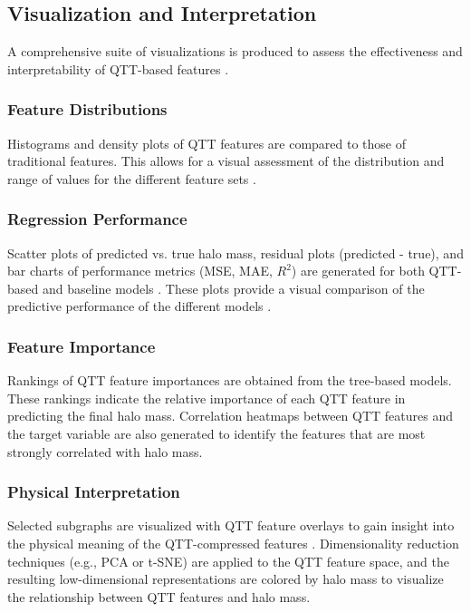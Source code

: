 \documentclass[twocolumn]{aastex631}
\begin{document}
\subsection{Visualization and Interpretation}
A comprehensive suite of visualizations is produced to assess the effectiveness and interpretability of QTT-based features \citep{shi2025machinelearningpipelinehunting,donosooliva2025astromer2,yang2025blackholemimickersshapirofree}.

\subsubsection{Feature Distributions}
Histograms and density plots of QTT features are compared to those of traditional features. This allows for a visual assessment of the distribution and range of values for the different feature sets \citep{newburger2023comparingoverlappingdatadistributions,niu2025comparativeanalysisemceegaussian}.

\subsubsection{Regression Performance}
Scatter plots of predicted vs. true halo mass, residual plots (predicted - true), and bar charts of performance metrics (MSE, MAE, \(R^2\)) are generated for both QTT-based and baseline models \citep{larson2024predictingdarkmatterhalo,zhao2025halosgalaxiesviimproved}. These plots provide a visual comparison of the predictive performance of the different models \citep{larson2024predictingdarkmatterhalo}.

\subsubsection{Feature Importance}
Rankings of QTT feature importances are obtained from the tree-based models. These rankings indicate the relative importance of each QTT feature in predicting the final halo mass. Correlation heatmaps between QTT features and the target variable are also generated to identify the features that are most strongly correlated with halo mass.

\subsubsection{Physical Interpretation}
Selected subgraphs are visualized with QTT feature overlays to gain insight into the physical meaning of the QTT-compressed features \citep{ye2024quantizedtensornetworkssolving}. Dimensionality reduction techniques (e.g., PCA or t-SNE) are applied to the QTT feature space, and the resulting low-dimensional representations are colored by halo mass to visualize the relationship between QTT features and halo mass.
\end{document}
